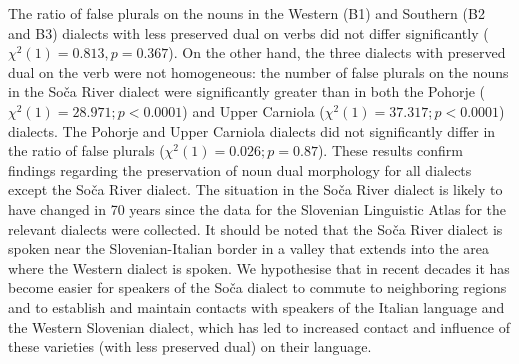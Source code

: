 \documentclass[output=paper,colorlinks,citecolor=brown]{langscibook}
\begin{document}
\begin{table}
    \caption{The frequency of dual and false plural noun forms.}
    \label{tab:pav:03}
\end{table}

\noindent The ratio of false plurals on the nouns in the Western (B1) and Southern (B2 and B3) dialects with less preserved dual on verbs did not differ significantly ($\chi^2(1)=0.813, p=0.367$). On the other hand, the three dialects with preserved dual on the verb were not homogeneous: the number of false plurals on the nouns in the Soča River dialect were significantly greater than in both the Pohorje ($\chi^2(1)=28.971; p<0.0001$) and Upper Carniola ($\chi^2(1)=37.317; p<0.0001$) dialects. The Pohorje and Upper Carniola dialects did not significantly differ in the ratio of false plurals ($\chi^2(1)=0.026; p=0.87$). These results confirm  findings regarding the preservation of noun dual morphology for all dialects except the Soča River dialect. The  situation in the Soča River dialect is likely to have changed in 70 years since the data for the Slovenian Linguistic Atlas for the relevant dialects were collected. It should be noted that the Soča River dialect is spoken near the Slovenian-Italian border in a valley that extends into the area where the Western dialect is spoken. We hypothesise that in recent decades it has become easier for speakers of the Soča dialect to commute to neighboring regions and to establish and maintain contacts with speakers of the Italian language and the Western Slovenian dialect, which has led to increased contact and influence of these varieties (with less preserved dual) on their language.
\end{document}
